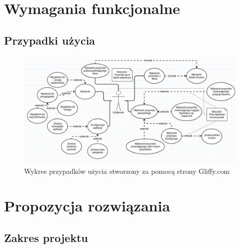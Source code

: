 \documentclass[twoside,a4paper]{book}
\begin{document}
 
\section{Wymagania funkcjonalne}
\subsection{Przypadki użycia}
\begin{figure}[!h]
		\centering
		\includegraphics[scale=0.4]{img/useCase.jpg}
		\caption{Wykres przypadków użycia stworzony za pomocą strony Gliffy.com}
		\label{fig:useCase}
\end{figure}

\section{Propozycja rozwiązania}
\subsection{Zakres projektu}
\end{document}
